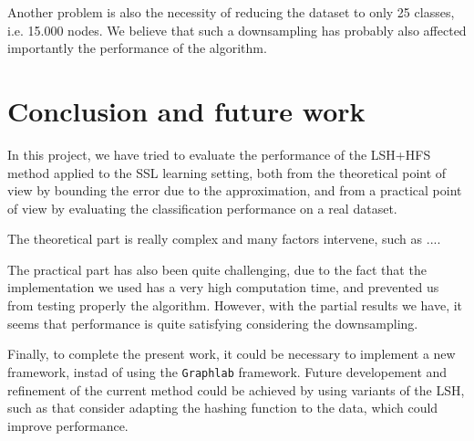 \documentclass{article} %
\begin{document}
Another problem is also the necessity of reducing the dataset to only 25 classes, i.e. 15.000 nodes. We believe that such a downsampling has probably also affected importantly the performance of the algorithm.

\section{Conclusion and future work}

In this project, we have tried to evaluate the performance of the LSH+HFS method applied to the SSL learning setting, both from the theoretical point of view by bounding the error due to the approximation, and from a practical point of view by evaluating the classification performance on a real dataset.

The theoretical part is really complex and many factors intervene, such as ....

The practical part has also been quite challenging, due to the fact that the implementation we used has a very high computation time, and prevented us from testing properly the algorithm. However, with the partial results we have, it seems that performance is quite satisfying considering the downsampling.

Finally, to complete the present work, it could be necessary to implement a new framework, instad of using the \texttt{Graphlab} framework. Future developement and refinement of the current method could be achieved by using variants of the LSH, such as \cite{andoni2015optimal, andoni2014beyond} that consider adapting the hashing function to the data, which could improve performance. 


\end{document}
